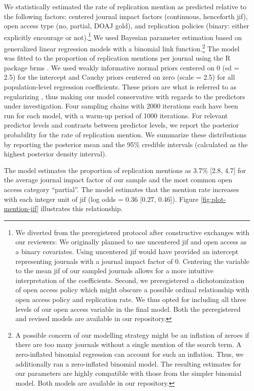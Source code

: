 \documentclass[cm,linguex]{glossa}
\begin{document}
We statistically estimated the rate of replication mention as predicted relative to the following factors:
centered journal impact factors (continuous, henceforth jif), open access type (no, partial, DOAJ gold), and replication policies (binary: either explicitly encourage or not).\footnote{We diverted from the preregistered protocol after constructive exchanges with our reviewers: We originally planned to use uncentered jif and open access as a binary covariates. Using uncentered jif would have provided an intercept representing journals with a journal impact factor of 0. Centering the variable to the mean jif of our sampled journals allows for a more intuitive interpretation of the coefficients. Second, we preregistered a dichotomization of open access policy which might obscure a possible ordinal relationship with open access policy and replication rate. We thus opted for including all three levels of our open access variable in the final model. Both the preregistered and revised models are available in our repository.}
We used Bayesian parameter estimation based on generalized linear regression models with a binomial link function.\footnote{A possible concern of our modelling strategy might be an inflation of zeroes if there are too many journals without a single mention of the search term. A zero-inflated binomial regression can account for such an inflation. Thus, we additionally ran a zero-inflated binomial model. The resulting estimates for our parameters are highly compatible with those from the simpler binomial model. Both models are available in our repository.}
The model was fitted to the proportion of replication mentions per journal using the R package brms \citep{burkner_brms_2016}.
We used weakly informative normal priors centered on 0 (sd = 2.5) for the intercept and Cauchy priors centered on zero (scale = 2.5) for all population-level regression coefficients.
These priors are what is referred to as regularizing \citep{gelman_weakly_2008}, thus making our model conservative with regards to the predictors under investigation.
Four sampling chains with 2000 iterations each have been run for each model, with a warm-up period of 1000 iterations.
For relevant predictor levels and contrasts between predictor levels, we report the posterior probability for the rate of replication mention.
We summarize these distributions by reporting the posterior mean and the 95\% credible intervals (calculated as the highest posterior density interval).

The model estimates the proportion of replication mentions as 3.7\% {[}2.8, 4.7{]} for the average journal impact factor of our sample and the most common open access category ``partial''. The model estimates that the mention rate increases with each integer unit of jif (log odds = 0.36 {[}0.27, 0.46{]}).
Figure \ref{fig:plot-mention-jif} illustrates this relationship.
\end{document}
